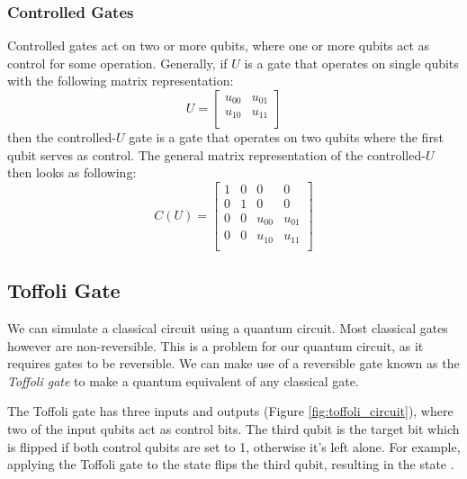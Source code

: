 \documentclass[11pt]{article}
\begin{document}
\subsubsection{Controlled Gates}
Controlled gates act on two or more qubits, where one or more qubits act as control for some operation. Generally, if $U$ is a gate that operates on single qubits with the following matrix representation:
\[
  U =
  \begin{bmatrix}
  u_{00} & u_{01} \\
  u_{10} & u_{11} \\
  \end{bmatrix}
\]
then the controlled-$U$ gate is a gate that operates on two qubits where the first qubit serves as control. The general matrix representation of the controlled-$U$ then looks as following:
\[
  C(U) =
  \begin{bmatrix}
  1 & 0 & 0 & 0 \\
  0 & 1 & 0 & 0 \\
  0 & 0 & u_{00} & u_{01} \\
  0 & 0 & u_{10} & u_{11} \\
  \end{bmatrix}
\]
\subsection{Toffoli Gate}
We can simulate a classical circuit using a quantum circuit. Most classical gates however are non-reversible. This is a problem for our quantum circuit, as it requires gates to be reversible. We can make use of a reversible gate known as the \emph{Toffoli gate} to make a quantum equivalent of any classical gate.

The Toffoli gate has three inputs and outputs (Figure \ref{fig:toffoli_circuit}), where two of the input qubits act as control bits. The third qubit is the target bit which is flipped if both control qubits are set to 1, otherwise it's left alone. For example, applying the Toffoli gate to the state  flips the third qubit, resulting in the state .
\end{document}
